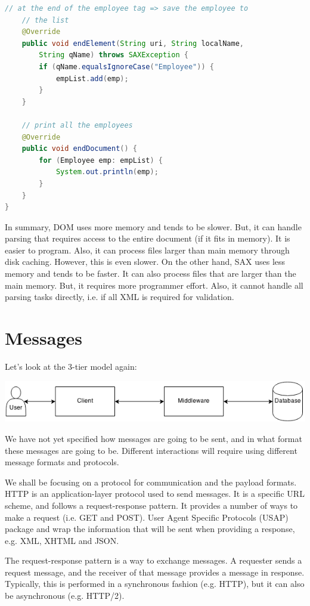 \documentclass[a4paper, openany]{memoir}
\begin{document}
\begin{lstlisting}[language=java]
    // at the end of the employee tag => save the employee to 
    // the list
    @Override
    public void endElement(String uri, String localName, 
        String qName) throws SAXException {
        if (qName.equalsIgnoreCase("Employee")) {
            empList.add(emp);
        }
    }
    
    // print all the employees
    @Override
    public void endDocument() {
        for (Employee emp: empList) {
            System.out.println(emp);
        }
    }
}
\end{lstlisting}

In summary, DOM uses more memory and tends to be slower. But, it can handle parsing that requires access to the entire document (if it fits in memory). It is easier to program. Also, it can process files larger than main memory through disk caching. However, this is even slower. On the other hand, SAX uses less memory and tends to be faster. It can also process files that are larger than the main memory. But, it requires more programmer effort. Also, it cannot handle all parsing tasks directly, i.e. if all XML is required for validation.
\newpage

\section{Messages}
Let's look at the 3-tier model again:
\begin{center}
    \includegraphics[scale=0.8]{src/L8I1.png}
\end{center}
We have not yet specified how messages are going to be sent, and in what format these messages are going to be. Different interactions will require using different message formats and protocols.

We shall be focusing on a protocol for communication and the payload formats. HTTP is an application-layer protocol used to send messages. It is a specific URL scheme, and follows a request-response pattern. It provides a number of ways to make a request (i.e. GET and POST). User Agent Specific Protocols (USAP) package and wrap the information that will be sent when providing a response, e.g. XML, XHTML and JSON.

The request-response pattern is a way to exchange messages. A requester sends a request message, and the receiver of that message provides a message in response. Typically, this is performed in a synchronous fashion (e.g. HTTP), but it can also be asynchronous (e.g. HTTP/2).
\end{document}
